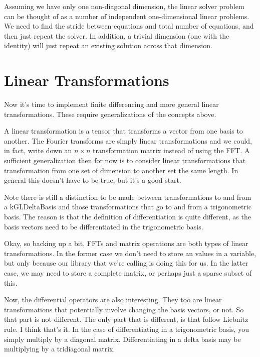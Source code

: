 \documentclass[11pt]{article}
\begin{document}
Assuming we have only one non-diagonal dimension, the linear solver problem can be thought of as a number of independent one-dimensional linear problems. We need to find the stride between equations and total number of equations, and then just repeat the solver. In addition, a trivial dimension (one with the identity) will just repeat an existing solution across that dimension.

%
\section{}
%

%
%

\section{Linear Transformations}

Now it's time to implement finite differencing and more general linear transformations. These require generalizations of the concepts above.

A linear transformation is a tensor that transforms a vector from one basis to another. The Fourier transforms are simply linear transformations and we could, in fact, write down an $n \times n$ transformation matrix instead of using the FFT. A sufficient generalization then for now is to consider linear transformations that transformation from one set of dimension to another set the same length. In general this doesn't have to be true, but it's a good start.

Note there is still a distinction to be made between transformations to and from a kGLDeltaBasis and those transformations that go to and from a trigonometric basis. The reason is that the definition of differentiation is quite different, as the basis vectors need to be differentiated in the trigonometric basis.

Okay, so backing up a bit, FFTs and matrix operations are both types of linear transformations. In the former case we don't need to store an values in a variable, but only because our library that we're calling is doing this for us. In the latter case, we may need to store a complete matrix, or perhaps just a sparse subset of this.

Now, the differential operators are also interesting. They too are linear transformations that potentially involve changing the basis vectors, or not. So that part is not different. The only part that is different, is that follow Liebnitz rule. I think that's it. In the case of differentiating in a trigonometric basis, you simply multiply by a diagonal matrix. Differentiating in a delta basis may be multiplying by a tridiagonal matrix.
\end{document}
